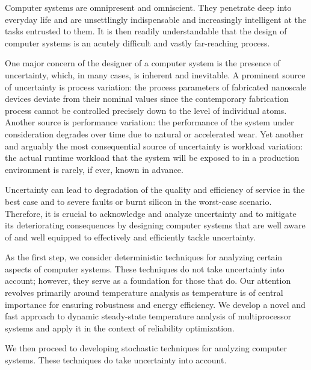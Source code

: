 Computer systems are omnipresent and omniscient. They penetrate deep into
everyday life and are unsettlingly indispensable and increasingly intelligent at
the tasks entrusted to them. It is then readily understandable that the design
of computer systems is an acutely difficult and vastly far-reaching process.

One major concern of the designer of a computer system is the presence of
uncertainty, which, in many cases, is inherent and inevitable. A prominent
source of uncertainty is process variation: the process parameters of fabricated
nanoscale devices deviate from their nominal values since the contemporary
fabrication process cannot be controlled precisely down to the level of
individual atoms. Another source is performance variation: the performance of
the system under consideration degrades over time due to natural or accelerated
wear. Yet another and arguably the most consequential source of uncertainty is
workload variation: the actual runtime workload that the system will be exposed
to in a production environment is rarely, if ever, known in advance.

Uncertainty can lead to degradation of the quality and efficiency of service in
the best case and to severe faults or burnt silicon in the worst-case scenario.
Therefore, it is crucial to acknowledge and analyze uncertainty and to mitigate
its deteriorating consequences by designing computer systems that are well aware
of and well equipped to effectively and efficiently tackle uncertainty.

As the first step, we consider deterministic techniques for analyzing certain
aspects of computer systems. These techniques do not take uncertainty into
account; however, they serve as a foundation for those that do. Our attention
revolves primarily around temperature analysis as temperature is of central
importance for ensuring robustness and energy efficiency. We develop a novel and
fast approach to dynamic steady-state temperature analysis of multiprocessor
systems and apply it in the context of reliability optimization.

We then proceed to developing stochastic techniques for analyzing computer
systems. These techniques do take uncertainty into account.
